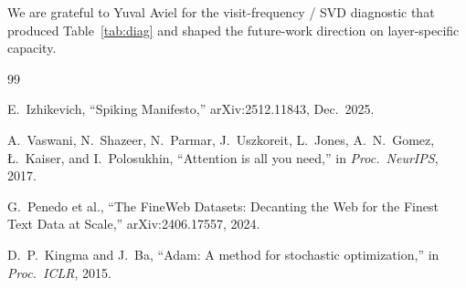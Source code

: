 \documentclass[11pt]{article}
\begin{document}
We are grateful to Yuval Aviel for the visit-frequency / SVD diagnostic that produced Table~\ref{tab:diag} and shaped the future-work direction on layer-specific capacity.


\begin{thebibliography}{99}

E.~Izhikevich, ``Spiking Manifesto,'' arXiv:2512.11843, Dec.~2025.

A.~Vaswani, N.~Shazeer, N.~Parmar, J.~Uszkoreit, L.~Jones, A.~N.~Gomez, \L.~Kaiser, and I.~Polosukhin,
``Attention is all you need,'' in \emph{Proc.\ NeurIPS}, 2017.

G.~Penedo et al., ``The FineWeb Datasets: Decanting the Web for the Finest Text Data at Scale,'' arXiv:2406.17557, 2024.

D.~P.~Kingma and J.~Ba, ``Adam: A method for stochastic optimization,'' in \emph{Proc.\ ICLR}, 2015.

\end{thebibliography}
\end{document}
